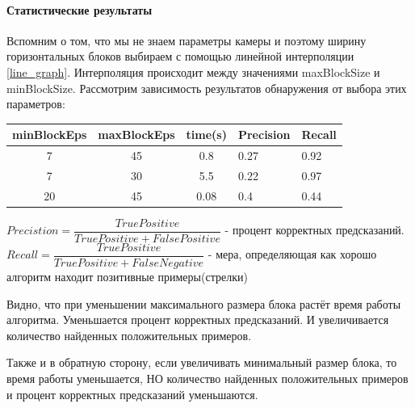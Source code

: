\paragraph{Статистические результаты}
Вспомним о том, что мы не знаем параметры камеры и поэтому ширину горизонтальных блоков выбираем с помощью линейной интерполяции \ref{line_graph}. Интерполяция происходит между значениями maxBlockSize и minBlockSize. 
Рассмотрим зависимость результатов обнаружения от выбора этих параметров:
\begin{table}[!h]
	\begin{tabular}{|c|c|c|l|l|}
		\hline
		\multicolumn{1}{|l|}{\textbf{minBlockEps}} & \multicolumn{1}{l|}{\textbf{maxBlockEps}} & \multicolumn{1}{l|}{\textbf{time(s)}} & \textbf{Precision} & \textbf{Recall} \\ \hline
		7                                          & 45                                        & 0.8                                   & 0.27               & 0.92            \\ \hline
		7                                          & 30                                        & 5.5                                   & 0.22                & 0.97            \\ \hline
		20                                         & 45                                        & 0.08                                  & 0.4               & 0.44             \\ \hline
	\end{tabular}
\end{table}
\newline
$Precistion = \dfrac{TruePositive}{TruePositive + FalsePositive}$ - процент корректных предсказаний.
\newline
$Recall = \dfrac{TruePositive}{TruePositive + FalseNegative}$ - мера, определяющая как хорошо алгоритм находит позитивные примеры(стрелки)

\newpage
Видно, что при уменьшении максимального размера блока растёт время работы алгоритма. Уменьшается процент корректных предсказаний. И увеличивается количество найденных положительных примеров. 

Также и в обратную сторону, если увеличивать минимальный размер блока, то время работы уменьшается, НО количество найденных положительных примеров и процент корректных предсказаний уменьшаются. 

